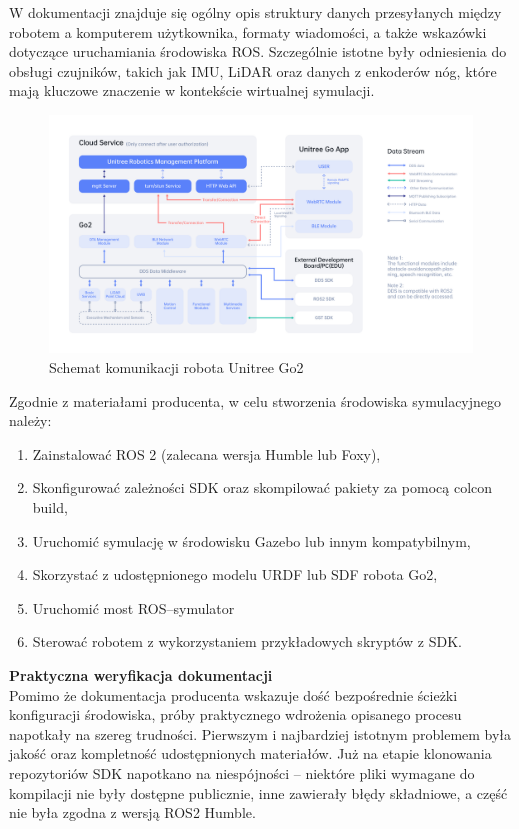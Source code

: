 \documentclass[12pt]{article}
\begin{document}
\noindent W dokumentacji znajduje się ogólny opis struktury danych przesyłanych między robotem a komputerem użytkownika, formaty wiadomości, a także wskazówki dotyczące uruchamiania środowiska ROS. Szczególnie istotne były odniesienia do obsługi czujników, takich jak IMU, LiDAR oraz danych z enkoderów nóg, które mają kluczowe znaczenie w kontekście wirtualnej symulacji.\\

\begin{figure}[h]
    \centering
    \includegraphics[width=1\linewidth]{Zdjęcia/schematKomunikacji.png}
    \caption{Schemat komunikacji robota Unitree Go2}
    \label{fig:schematKomunikacji}
\end{figure}

Zgodnie z materiałami producenta, w celu stworzenia środowiska symulacyjnego należy:
\begin{enumerate}
    \item Zainstalować ROS 2 (zalecana wersja Humble lub Foxy),
    \item Skonfigurować zależności SDK oraz skompilować pakiety za pomocą colcon build,
    \item Uruchomić symulację w środowisku Gazebo lub innym kompatybilnym,
    \item Skorzystać z udostępnionego modelu URDF lub SDF robota Go2,
    \item Uruchomić most ROS–symulator
    \item Sterować robotem z wykorzystaniem przykładowych skryptów z SDK. 
\end{enumerate}


\noindent \textbf{Praktyczna weryfikacja dokumentacji}\\

\noindent Pomimo że dokumentacja producenta wskazuje dość bezpośrednie ścieżki konfiguracji środowiska, próby praktycznego wdrożenia opisanego procesu napotkały na szereg trudności. Pierwszym i najbardziej istotnym problemem była jakość oraz kompletność udostępnionych materiałów. Już na etapie klonowania repozytoriów SDK napotkano na niespójności – niektóre pliki wymagane do kompilacji nie były dostępne publicznie, inne zawierały błędy składniowe, a część nie była zgodna z wersją ROS2 Humble.\\
\end{document}
